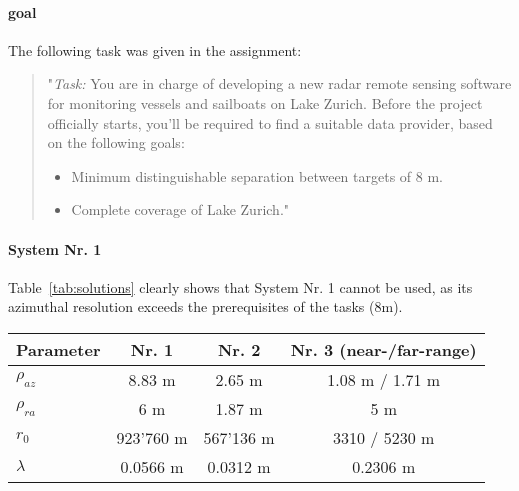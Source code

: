 \documentclass[11pt,a4paper,BCOR12mm, headexclude, footexclude, twoside, openright]{scrartcl}
\numberwithin{equation}{section} %
\numberwithin{figure}{section} %
\numberwithin{table}{section} %
\begin{document}
\paragraph{goal}The following task was given in the assignment:
\begin{quotation}"\emph{Task:} You are in charge of developing a new radar remote sensing software for monitoring vessels and sailboats on Lake Zurich. Before the project officially starts, you’ll be required to find a suitable data provider, based on the following goals:

\begin{itemize}
  \item Minimum distinguishable separation between targets of 8 m.
  \item Complete coverage of Lake Zurich."
\end{itemize}
\end{quotation}

\newpage

{%
  \renewcommand{\headrulewidth}{0.5pt}%
  \renewcommand{\footrulewidth}{0.5pt}
  \fancyhf{}%
  \fancyhead[R]{\emph{\footnotesize \today}}
}

\thispagestyle{plain}

\paragraph{System Nr. 1}Table~\ref{tab:solutions} clearly shows that System Nr. 1 cannot be used, as its azimuthal resolution exceeds the prerequisites of the tasks (8m).

\begin{table}[h]
\centering
{}
\begin{tabular}{l c c c}
\toprule[1pt] \textbf{Parameter} & \textbf{Nr. 1} & \textbf{Nr. 2} & \textbf{Nr. 3 (near-/far-range)}\\\midrule[0.5pt]
${\rho}_{az}$ & 8.83 m &2.65 m & 1.08 m / 1.71 m \\
${\rho}_{ra}$ & 6 m & 1.87 m & 5 m\\
${r}_{0}$ & 923'760 m & 567'136 m & 3310 / 5230 m \\
$\lambda$ & 0.0566 m & 0.0312 m & 0.2306 m\\
\bottomrule[1pt]
\end{tabular}
\end{table}
\end{document}
